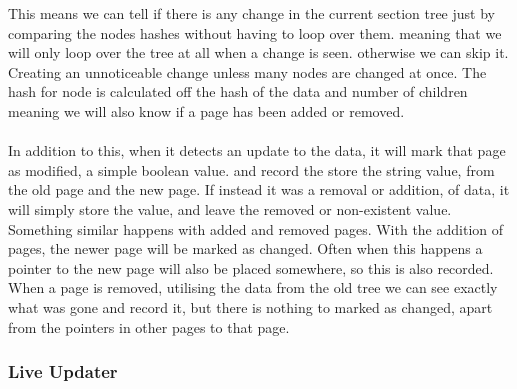 This means we can tell if there is any change in the current section tree just by comparing the nodes hashes without having to loop over them. meaning that we will only loop over the tree at all when a change is seen. otherwise we can skip it. Creating an unnoticeable change unless many nodes are changed at once. The hash for node is calculated off the hash of the data and number of children meaning we will also know if a page has been added or removed. 
\\\\
In addition to this, when it detects an update to the data, it will mark that page as modified, a simple boolean value. and record the store the string value, from the old page and the new page. If instead it was a removal or addition, of data, it will simply store the value, and leave the removed or non-existent value. Something similar happens with added and removed pages. With the addition of pages, the newer page will be marked as changed. Often when this happens a pointer to the new page will also be placed somewhere, so this is also recorded. When a  page is removed, utilising the data from the old tree we can see exactly what was gone and record it, but there is nothing to marked as changed, apart from the pointers in other pages to that page. 

\subsubsection{Live Updater}
\label{subsubsec:live_Updater_imp}

